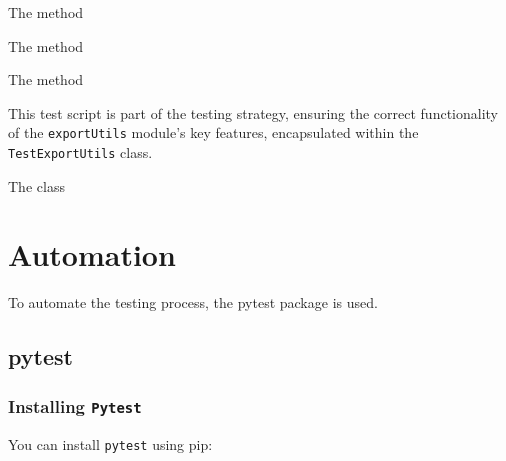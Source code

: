 \begin{code}[h!]
	
	
	\caption{The  method}
	\label{code:testExportModel}
\end{code}

\begin{code}[h!]
	
	
	\caption{The  method}
	\label{code:testSaveModel}
\end{code}

\begin{code}
	
	
	\caption{The  method}
	\label{code:testConvertToTFLite}
\end{code}

This test script is part of the testing strategy, ensuring the correct functionality of the \texttt{exportUtils} module's key features, encapsulated within the \texttt{TestExportUtils} class.

\begin{code}[h!]
	
	
	\caption{The  class}
	\label{code:TestExportUtils}
\end{code}


\section{Automation}

To automate the testing process, the pytest package is used.

\subsection{pytest}
\label{subsection:pytest}

\subsubsection{Installing \texttt{Pytest}}

You can install \texttt{pytest} using pip:


